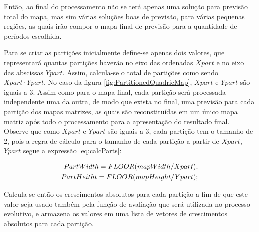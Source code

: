 Então, ao final do processamento não se terá apenas uma solução para previsão  total do mapa, mas sim várias soluções boas de previsão, para várias pequenas regiões, as quais irão compor o mapa final de previsão para a quantidade de períodos escolhida.

Para se criar as partições inicialmente define-se apenas dois valores, que representará quantas partições haverão no eixo das ordenadas \(Xpart\) e no eixo das abscissas \(Ypart\). Assim, calcula-se o total de partições como sendo \(Xpart \cdot Ypart\). No caso da figura \ref{fig:PartitionedQuadricMap}, \(Xpart\) e \(Ypart\) são iguais a 3. Assim como para o mapa final, cada partição será processada independente uma da outra, de modo que exista no final, uma previsão para cada partição dos mapas matrizes, as quais são reconstituídas em um único mapa matriz após todo o processamento para a apresentação do resultado final. Observe que como \(Xpart\) e \(Ypart\) são iguais a 3, cada partição tem o tamanho de 2, pois a regra de cálculo para o tamanho de cada partição a partir de \(Xpart\), \(Ypart\) segue a expressão \ref{eq:calcParts}:

\begin{equation}
\label{eq:calcParts}
\centering
\begin{split}
PartWidth = FLOOR(mapWidth / Xpart);\\
PartHeitht = FLOOR(mapHeight / Ypart);
\end{split}
\end{equation}

Calcula-se então os crescimentos absolutos para cada partição a fim de que este valor seja usado também pela função de avaliação que será utilizada no processo evolutivo, e armazena os valores em uma lista de vetores de crescimentos absolutos para cada partição. 

